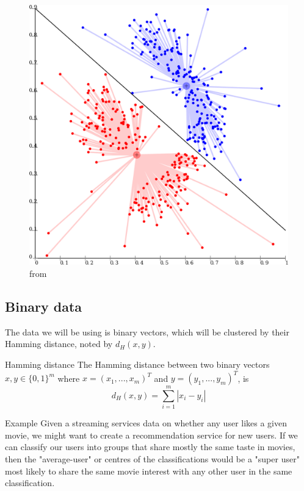 \documentclass{beamer}
\begin{document}
\begin{frame}
  \begin{figure}
    \centering
    \includegraphics[height=0.75\textheight]{figures/1024px-KMeans-density-data.svg.png}
    \caption{from \cite{cluster:picture}}
  \end{figure}
\end{frame}

\subsection{Binary data}
\begin{frame}
  The data we will be using is \alert{binary vectors}, which will be
  clustered by their \alert{Hamming distance}, noted by $d_H(x,y)$.

  \begin{block}{Hamming distance}
    The Hamming distance between two binary vectors $x,y \in \{0,1\}^m$
    where $x=(x_1,...,x_m)^T$ and $y=(y_1,...,y_m)^T$, is
    \[
      d_H(x,y)= \sum_{i = 1}^{m} |x_i - y_i|
    \]
  \end{block}
\end{frame}

\begin{frame}
  \begin{block}{Example}
    Given a streaming services data on whether any user likes a given movie,
    we might want to create a recommendation service for new users.
    If we can classify our users into groups that share mostly the same taste in movies, then
    the "average-user" or centres of the classifications would be a "super user" most likely to share the same movie
    interest with any other user in the same classification.
  \end{block}
\end{frame}
\end{document}
